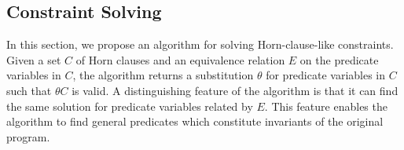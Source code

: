 


\subsection{Constraint Solving}
\label{sec:cs}

In this section, we propose an algorithm for solving Horn-clause-like 
constraints.  Given a set \(C\) of Horn clauses and an equivalence 
relation \(E\) on the predicate variables in \(C\), the algorithm 
returns a substitution \(\theta\) for predicate variables in \(C\) such 
that \(\theta C\) is valid.  A distinguishing feature of the algorithm 
is that it can find the same solution for predicate variables related by 
\(E\).  This feature enables the algorithm to find general predicates 
which constitute invariants of the original program.

